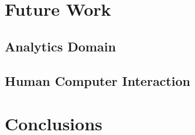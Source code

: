 \documentclass[12pt]{report}
\begin{document}
\chapter{Future Work}
\section{ Analytics Domain }
\section{ Human Computer Interaction }



\newpage
\chapter{Conclusions}


\newpage
{}

\end{document}
